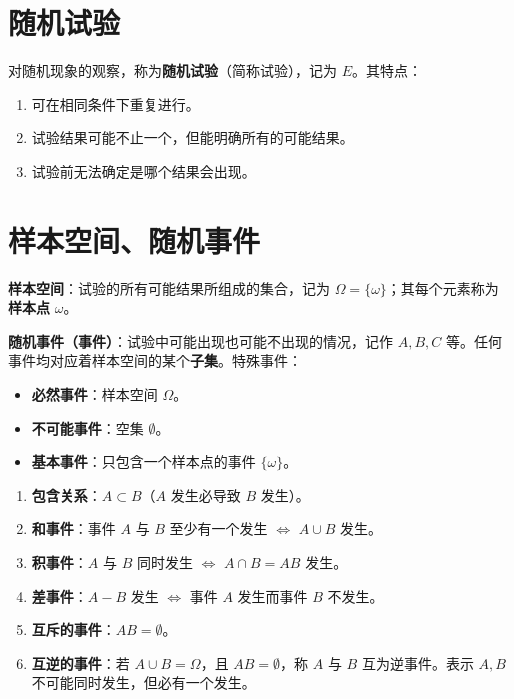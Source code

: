 \section{随机试验}
\begin{definition}[随机试验]
对随机现象的观察，称为\textbf{随机试验}（简称试验），记为 $E$。其特点：
\begin{enumerate}
	\item 可在相同条件下重复进行。
	\item 试验结果可能不止一个，但能明确所有的可能结果。
	\item 试验前无法确定是哪个结果会出现。
\end{enumerate}
\end{definition}

\section{样本空间、随机事件}
\begin{definition}[样本空间与随机事件]
\textbf{样本空间}：试验的所有可能结果所组成的集合，记为 $\Omega = \{\omega\}$；其每个元素称为\textbf{样本点} $\omega$。

\textbf{随机事件（事件）}：试验中可能出现也可能不出现的情况，记作 $A, B, C$ 等。任何事件均对应着样本空间的某个\textbf{子集}。特殊事件：
\begin{itemize}
	\item \textbf{必然事件}：样本空间 $\Omega$。
	\item \textbf{不可能事件}：空集 $\emptyset$。
	\item \textbf{基本事件}：只包含一个样本点的事件 $\{\omega\}$。
\end{itemize}
\end{definition}

\begin{property}[事件间的关系]
\begin{enumerate}
	\item \textbf{包含关系}：$A \subset B$（$A$ 发生必导致 $B$ 发生）。
	\item \textbf{和事件}：事件 $A$ 与 $B$ 至少有一个发生 $\Leftrightarrow$ $A \cup B$ 发生。
	\item \textbf{积事件}：$A$ 与 $B$ 同时发生 $\Leftrightarrow$ $A \cap B = AB$ 发生。
	\item \textbf{差事件}：$A - B$ 发生 $\Leftrightarrow$ 事件 $A$ 发生而事件 $B$ 不发生。
	\item \textbf{互斥的事件}：$AB = \emptyset$。
	\item \textbf{互逆的事件}：若 $A \cup B = \Omega$，且 $AB = \emptyset$，称 $A$ 与 $B$ 互为逆事件。表示 $A, B$ 不可能同时发生，但必有一个发生。
\end{enumerate}
\end{property}

